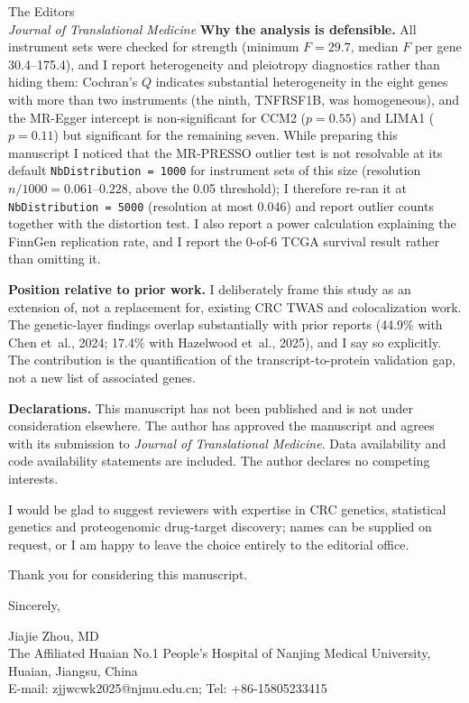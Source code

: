 \documentclass[11pt,a4paper]{letter}
\begin{document}
\begin{letter}{The Editors \\
\textit{Journal of Translational Medicine}}
\textbf{Why the analysis is defensible.} All instrument sets were checked for strength (minimum $F = 29.7$, median $F$ per gene 30.4--175.4), and I report heterogeneity and pleiotropy diagnostics rather than hiding them: Cochran's $Q$ indicates substantial heterogeneity in the eight genes with more than two instruments (the ninth, TNFRSF1B, was homogeneous), and the MR-Egger intercept is non-significant for CCM2 ($p = 0.55$) and LIMA1 ($p = 0.11$) but significant for the remaining seven. While preparing this manuscript I noticed that the MR-PRESSO outlier test is not resolvable at its default \texttt{NbDistribution = 1000} for instrument sets of this size (resolution $n/1000 = 0.061$--$0.228$, above the 0.05 threshold); I therefore re-ran it at \texttt{NbDistribution = 5000} (resolution at most 0.046) and report outlier counts together with the distortion test. I also report a power calculation explaining the FinnGen replication rate, and I report the 0-of-6 TCGA survival result rather than omitting it.

\textbf{Position relative to prior work.} I deliberately frame this study as an extension of, not a replacement for, existing CRC TWAS and colocalization work. The genetic-layer findings overlap substantially with prior reports (44.9\% with Chen et~al., 2024; 17.4\% with Hazelwood et~al., 2025), and I say so explicitly. The contribution is the quantification of the transcript-to-protein validation gap, not a new list of associated genes.

\textbf{Declarations.} This manuscript has not been published and is not under consideration elsewhere. The author has approved the manuscript and agrees with its submission to \textit{Journal of Translational Medicine}. Data availability and code availability statements are included. The author declares no competing interests.

I would be glad to suggest reviewers with expertise in CRC genetics, statistical genetics and proteogenomic drug-target discovery; names can be supplied on request, or I am happy to leave the choice entirely to the editorial office.

Thank you for considering this manuscript.

\closing{Sincerely,}

\vspace{1cm}
Jiajie Zhou, MD \\
The Affiliated Huaian No.1 People's Hospital of Nanjing Medical University, Huaian, Jiangsu, China \\[0.4em]
E-mail: zjjwcwk2025@njmu.edu.cn; Tel: +86-15805233415 \\[0.4em]

\end{letter}
\end{document}
